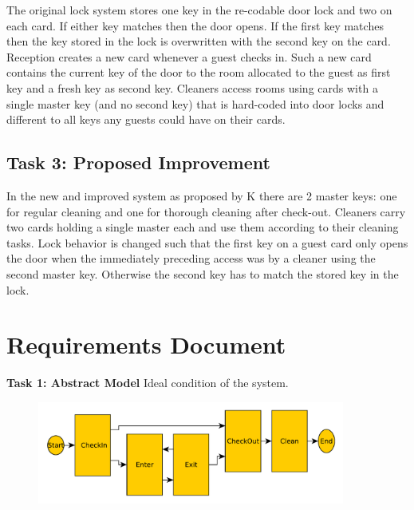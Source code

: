 \documentclass[a4paper]{article}
\begin{document}
The original lock system stores one key in the re-codable door lock and two on each card. If either key matches then the door opens. If the first key matches then the key stored in the lock is overwritten with the second key on the card. Reception creates a new card whenever a guest checks in. Such a new card contains the current key of the door to the room allocated to the guest as first key and a fresh key as second key. Cleaners access rooms using cards with a single master key (and no second key) that is hard-coded into door locks and different to all keys any guests could have on their cards.
\subsection{Task 3: Proposed Improvement}
In the new and improved system as proposed by K there are 2 master keys: one for regular cleaning and one for thorough cleaning after check-out. Cleaners carry two cards holding a single master each and use them according to their cleaning tasks. Lock behavior is changed such that the first key on a guest card only opens the door when the immediately preceding access was by a cleaner using the second master key. Otherwise the second key has to match the stored key in the lock.
\newpage
\section{Requirements Document}

\textbf{Task 1: Abstract Model}
Ideal condition of the system.

\begin{figure}[h!]
  \begin{center}
  \includegraphics[width=0.9\textwidth]{unnamed0.pdf}
  \end{center}
\end{figure}
\end{document}
